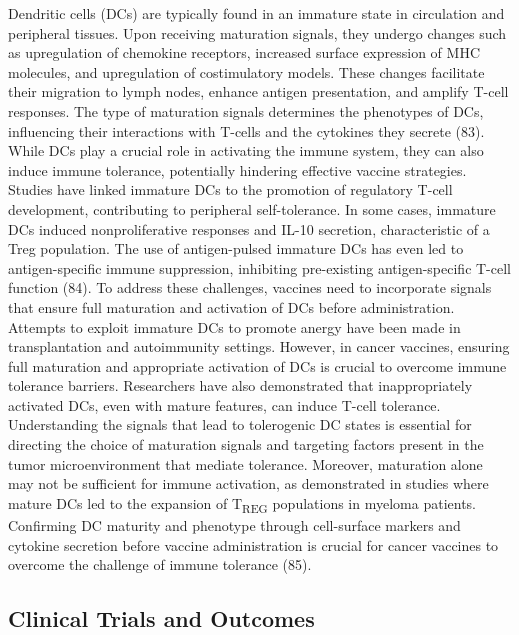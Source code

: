 \documentclass[
]{article}
\begin{document}
Dendritic cells (DCs) are typically found in an immature state in
circulation and peripheral tissues. Upon receiving maturation signals,
they undergo changes such as upregulation of chemokine receptors,
increased surface expression of MHC molecules, and upregulation of
costimulatory models. These changes facilitate their migration to lymph
nodes, enhance antigen presentation, and amplify T-cell responses. The
type of maturation signals determines the phenotypes of DCs, influencing
their interactions with T-cells and the cytokines they secrete (83).
While DCs play a crucial role in activating the immune system, they can
also induce immune tolerance, potentially hindering effective vaccine
strategies. Studies have linked immature DCs to the promotion of
regulatory T-cell development, contributing to peripheral
self-tolerance. In some cases, immature DCs induced nonproliferative
responses and IL-10 secretion, characteristic of a Treg population. The
use of antigen-pulsed immature DCs has even led to antigen-specific
immune suppression, inhibiting pre-existing antigen-specific T-cell
function (84). To address these challenges, vaccines need to incorporate
signals that ensure full maturation and activation of DCs before
administration. Attempts to exploit immature DCs to promote anergy have
been made in transplantation and autoimmunity settings. However, in
cancer vaccines, ensuring full maturation and appropriate activation of
DCs is crucial to overcome immune tolerance barriers. Researchers have
also demonstrated that inappropriately activated DCs, even with mature
features, can induce T-cell tolerance. Understanding the signals that
lead to tolerogenic DC states is essential for directing the choice of
maturation signals and targeting factors present in the tumor
microenvironment that mediate tolerance. Moreover, maturation alone may
not be sufficient for immune activation, as demonstrated in studies
where mature DCs led to the expansion of T\textsubscript{REG}
populations in myeloma patients. Confirming DC maturity and phenotype
through cell-surface markers and cytokine secretion before vaccine
administration is crucial for cancer vaccines to overcome the challenge
of immune tolerance (85).

\subsection{Clinical Trials and
Outcomes}\label{clinical-trials-and-outcomes}
\end{document}
